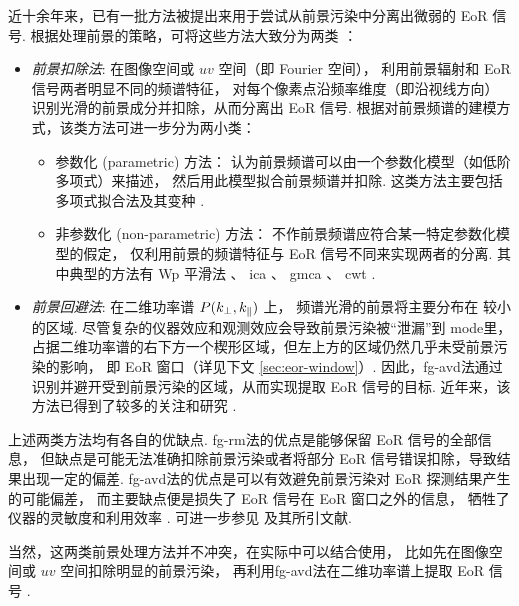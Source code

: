 近十余年来，已有一批方法被提出来用于尝试从前景污染中分离出微弱的 EoR 信号.
根据处理前景的策略，可将这些方法大致分为两类 \cite{chapman2015,chapman2016}：
\begin{itemize}
\item \emph{前景扣除法}:
在图像空间或 $uv$ 空间（即 Fourier 空间），
利用前景辐射和 EoR 信号两者明显不同的频谱特征，
对每个像素点沿频率维度（即沿视线方向）识别光滑的前景成分并扣除，从而分离出 EoR 信号.
根据对前景频谱的建模方式，该类方法可进一步分为两小类：
\begin{itemize}
  \item 参数化 (parametric) 方法：
    认为前景频谱可以由一个参数化模型（如低阶多项式）来描述，
    然后用此模型拟合前景频谱并扣除.
    这类方法主要包括多项式拟合法及其变种
    \cite{wang2006,jelic2008,liu2009fgrm,wang2013,bonaldi2015}.
  \item 非参数化 (non-parametric) 方法：
    不作前景频谱应符合某一特定参数化模型的假定，
    仅利用前景的频谱特征与 EoR 信号不同来实现两者的分离.
    其中典型的方法有
    Wp 平滑法 \cite{harker2009}、
    \ac{ica} \cite{chapman2012}、
    \ac{gmca} \cite{chapman2013}、
    \ac{cwt} \cite{gu2013}.
\end{itemize}

\item \emph{前景回避法}:
在二维功率谱 $P(k_{\perp}, k_{\parallel})$ 上，
频谱光滑的前景将主要分布在 \klos{} 较小的区域.
尽管复杂的仪器效应和观测效应会导致前景污染被\enquote{泄漏}到 \klos{} \ac{mode}里，
占据二维功率谱的右下方一个楔形区域，但左上方的区域仍然几乎未受前景污染的影响，
即 EoR 窗口（详见下文 \autoref{sec:eor-window}）.
因此，\ac{fg-avd}法通过识别并避开受到前景污染的区域，从而实现提取 EoR 信号的目标.
近年来，该方法已得到了较多的关注和研究 \cite{thyagarajan2013,liu2014,liu2014ii,
  barry2016,beardsley2016,trott2016,patil2017}.

\end{itemize}

上述两类方法均有各自的优缺点.
\ac{fg-rm}法的优点是能够保留 EoR 信号的全部信息，
但缺点是可能无法准确扣除前景污染或者将部分 EoR 信号错误扣除，导致结果出现一定的偏差.
\ac{fg-avd}法的优点是可以有效避免前景污染对 EoR 探测结果产生的可能偏差，
而主要缺点便是损失了 EoR 信号在 EoR 窗口之外的信息，
牺牲了仪器的灵敏度和利用效率 \cite{pober2014}.
可进一步参见  及其所引文献.

当然，这两类前景处理方法并不冲突，在实际中可以结合使用，
比如先在图像空间或 $uv$ 空间扣除明显的前景污染，
再利用\ac{fg-avd}法在二维功率谱上提取 EoR 信号 \cite{datta2010}.


